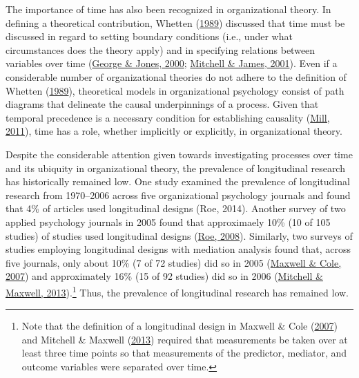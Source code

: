 \documentclass[
12pt, %
twoside,
english]{guelphthesis}
\begin{document}
The importance of time has also been recognized in organizational theory. In defining a theoretical contribution, Whetten (\protect\hyperlink{ref-whetten1989}{1989}) discussed that time must be discussed in regard to setting boundary conditions (i.e., under what circumstances does the theory apply) and in specifying relations between variables over time (\protect\hyperlink{ref-george2000}{George \& Jones, 2000}; \protect\hyperlink{ref-mitchell2001}{Mitchell \& James, 2001}). Even if a considerable number of organizational theories do not adhere to the definition of Whetten (\protect\hyperlink{ref-whetten1989}{1989}), theoretical models in organizational psychology consist of path diagrams that delineate the causal underpinnings of a process. Given that temporal precedence is a necessary condition for establishing causality (\protect\hyperlink{ref-mill2011}{Mill, 2011}), time has a role, whether implicitly or explicitly, in organizational theory.





Despite the considerable attention given towards investigating processes over time and its ubiquity in organizational theory, the prevalence of longitudinal research has historically remained low. One study examined the prevalence of longitudinal research from 1970--2006 across five organizational psychology journals and found that 4\% of articles used longitudinal designs (Roe, 2014). Another survey of two applied psychology journals in 2005 found that approximaely 10\% (10 of 105 studies) of studies used longitudinal designs (\protect\hyperlink{ref-roe2008}{Roe, 2008}). Similarly, two surveys of studies employing longitudinal designs with mediation analysis found that, across five journals, only about 10\% (7 of 72 studies) did so in 2005 (\protect\hyperlink{ref-maxwell2007}{Maxwell \& Cole, 2007}) and approximately 16\% (15 of 92 studies) did so in 2006 (\protect\hyperlink{ref-mitchell2013}{Mitchell \& Maxwell, 2013}).\footnote{Note that the definition of a longitudinal design in Maxwell \& Cole (\protect\hyperlink{ref-maxwell2007}{2007}) and Mitchell \& Maxwell (\protect\hyperlink{ref-mitchell2013}{2013}) required that measurements be taken over at least three time points so that measurements of the predictor, mediator, and outcome variables were separated over time.} Thus, the prevalence of longitudinal research has remained low.
\end{document}
